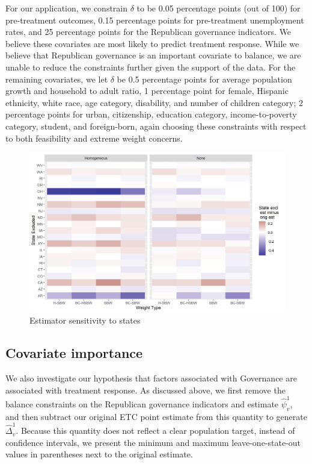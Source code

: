 For our application, we constrain $\delta$ to be 0.05 percentage points (out of 100) for pre-treatment outcomes, 0.15 percentage points for pre-treatment unemployment rates, and 25 percentage points for the Republican governance indicators. We believe these covariates are most likely to predict treatment response. While we believe that Republican governance is an important covariate to balance, we are unable to reduce the constraints further given the support of the data. For the remaining covariates, we let $\delta$ be 0.5 percentage points for average population growth and household to adult ratio, 1 percentage point for female, Hispanic ethnicity, white race, age category, disability, and number of children category; 2 percentage points for urban, citizenship, education category, income-to-poverty category, student, and foreign-born, again choosing these constraints with respect to both feasibility and extreme weight concerns. 
\begin{figure}[H]
\begin{center}
    \caption{Estimator sensitivity to states}
    \label{fig:loostateplot}
    \includegraphics[scale=0.6]{01_Plots/loostate-sensitivityc1-state-uu-i.png}
\end{center}
\end{figure}

\subsection{Covariate importance}

We also investigate our hypothesis that factors associated with Governance are associated with treatment response. As discussed above, we first remove the balance constraints on the Republican governance indicators and estimate $\hat{\psi}^1_v$, and then subtract our original ETC point estimate from this quantity to generate $\hat{\Delta}_v^1$. Because this quantity does not reflect a clear population target, instead of confidence intervals, we present the minimum and maximum leave-one-state-out values in parentheses next to the original estimate.

